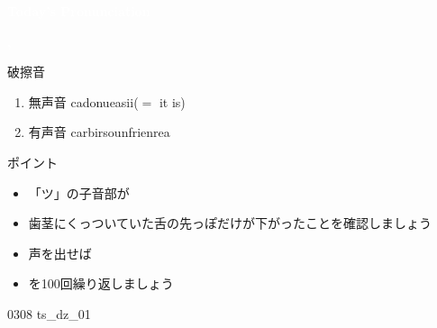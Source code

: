 \documentclass[aspectratio=169, xcolor={dvipsnames,table}]{beamer}
\begin{document}
\begin{frame}
  \centering
  \textcolor{white}{\Huge\bfseries Today's Pronunciation}\pause

  \vspace{30pt}

  \textcolor{white}{\Huge\bfseries {}, }

  \hfill\hyperlink{ex}{}
\end{frame}
\begin{frame}[plain,label=slide_ts_dz]{破擦音\,\,\,}
  \large

  \begin{enumerate}
    \item 無声音 \hspace{20pt}ca\hspace{1\zw}donu\hspace{1\zw}ea\hspace{1\zw}si\hspace{1\zw}i($=$
          it is)

    \item 有声音 \hspace{20pt}car\hspace{1\zw}bir\hspace{1\zw}soun\hspace{1\zw}frien\hspace{1\zw}rea
  \end{enumerate}

  \vspace*{20pt}

  \normalsize ポイント

  \begin{itemize}
    [circle]

    \item 「ツ」の子音部が

    \item 歯茎にくっついていた舌の先っぽだけが下がったことを確認しましょう

    \item 声を出せば

    \item {}を100回繰り返しましょう
  \end{itemize}
  \hfill{\tiny 0308}\,{\scriptsize {}}\,{\tiny ts\_dz\_01}
\end{frame}
\end{document}
